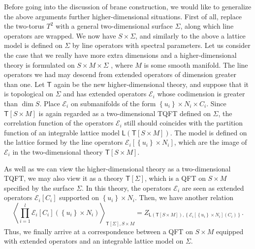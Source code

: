 Before going into the discussion of brane construction, we would like
to generalize the above arguments further higher-dimensional situations.
First of all, replace the two-torus $T^{2}$ with a general two-dimensional
surface $\Sigma$, along which line operators are wrapped. We now
have $S\times\Sigma$, and similarly to the above a lattice model
is defined on $\Sigma$ by line operators with spectral parameters.
Let us consider the case that we really have more extra dimensions
and a higher-dimensional theory is formulated on $S\times M\times\Sigma$
, where $M$ is some smooth manifold. The line operators we had may
descend from extended operators of dimension greater than one. Let
$\mathsf{T}$ again be the new higher-dimensional theory, and suppose
that it is topological on $\Sigma$ and has extended operators $\mathcal{E}_{i}$
whose codimension is greater than $\dim S$. Place $\mathcal{E}_{i}$
on submanifolds of the form $\left\{ u_{i}\right\} \times N_{i}\times C_{i}$.
Since $\mathsf{T}\left[S\times M\right]$ is again regarded as a two-dimensional
TQFT defined on $\Sigma$, the correlation function of the operators
$\mathcal{E}_{i}$ still should coincides with the partition function
of an integrable lattice model $\mathsf{L}\left(\mathsf{T}\left[S\times M\right]\right)$.
The model is defined on the lattice formed by the line operators $\mathcal{E}_{i}\left[\left\{ u_{i}\right\} \times N_{i}\right]$,
which are the image of $\mathcal{E}_{i}$ in the two-dimensional theory
$\mathsf{T}\left[S\times M\right]$.

As well as we can view the higher-dimensional theory as a two-dimensional
TQFT, we may also view it as a theory $\mathsf{T}\left[\Sigma\right]$,
which is a QFT on $S\times M$ specified by the surface $\Sigma$.
In this theory, the operators $\mathcal{E}_{i}$ are seen as extended
operators $\mathcal{E}_{i}\left[C_{i}\right]$ supported on $\left\{ u_{i}\right\} \times N_{i}$.
Then, we have another relation
\begin{equation}
  \left\langle \prod_{i=1}^{l}\mathcal{E}_{i}\left[C_{i}\right]\left(\left\{ u_{i}\right\} \times N_{i}\right)\right\rangle_{\mathsf{T}\left[\Sigma\right],S\times M}
    =Z_{\mathsf{L}\left(\mathsf{T}\left[S\times M\right]\right),\left\{ \mathcal{E}_{i}\left[\left\{ u_{i}\right\} \times N_{i}\right]\left(C_{i}\right)\right\} }.
\end{equation}
 Thus, we finally arrive at a correspondence between a QFT on $S\times M$
equipped with extended operators and an integrable lattice model on
$\Sigma$.

